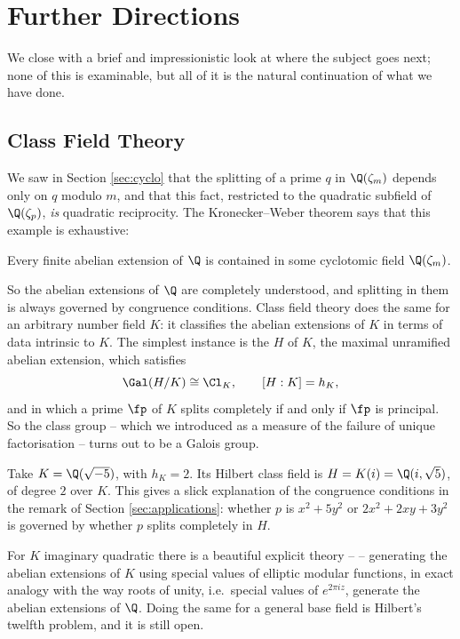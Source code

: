 \section{Further Directions}

We close with a brief and impressionistic look at where the subject goes next; none of this is examinable, but all of it is the natural continuation of what we have done.

\subsection{Class Field Theory}

We saw in Section \ref{sec:cyclo} that the splitting of a prime $q$ in $\Q(\zeta_m)$ depends only on $q$ modulo $m$, and that this fact, restricted to the quadratic subfield of $\Q(\zeta_p)$, \emph{is} quadratic reciprocity. The Kronecker--Weber theorem says that this example is exhaustive:

\begin{theorem}
	Every finite abelian extension of $\Q$ is contained in some cyclotomic field $\Q(\zeta_m)$.
\end{theorem}

So the abelian extensions of $\Q$ are completely understood, and splitting in them is always governed by congruence conditions. Class field theory does the same for an arbitrary number field $K$: it classifies the abelian extensions of $K$ in terms of data intrinsic to $K$. The simplest instance is the  $H$ of $K$, the maximal unramified abelian extension, which satisfies
$$\Gal(H/K)\cong\Cl_K, \qquad [H:K] = h_K,$$
and in which a prime $\fp$ of $K$ splits completely if and only if $\fp$ is principal. So the class group -- which we introduced as a measure of the failure of unique factorisation -- turns out to be a Galois group.

\begin{example}
	Take $K = \Q(\sqrt{-5})$, with $h_K = 2$. Its Hilbert class field is $H = K(i) = \Q(i,\sqrt5)$, of degree $2$ over $K$. This gives a slick explanation of the congruence conditions in the remark of Section \ref{sec:applications}: whether $p$ is $x^2+5y^2$ or $2x^2+2xy+3y^2$ is governed by whether $p$ splits completely in $H$.
\end{example}

For $K$ imaginary quadratic there is a beautiful explicit theory --  -- generating the abelian extensions of $K$ using special values of elliptic modular functions, in exact analogy with the way roots of unity, i.e.\ special values of $e^{2\pi iz}$, generate the abelian extensions of $\Q$. Doing the same for a general base field is Hilbert's twelfth problem, and it is still open.

